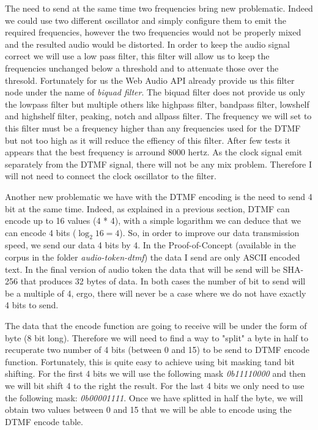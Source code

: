 \documentclass[twocolumn,14pt]{extarticle}
\begin{document}
The need to send at the same time two frequencies bring new problematic. Indeed we could use two different oscillator and simply configure them to emit the required frequencies, however the two frequencies would not be properly mixed and the resulted audio would be distorted. In order to keep the audio signal correct we will use a low pass filter, this filter will allow us to keep the frequencies unchanged below a threshold and to attenuate those over the thresold. Fortunately for us the Web Audio API already provide us this filter node under the name of \textit{biquad filter}. The biquad filter does not provide us only the lowpass filter but multiple others like highpass filter, bandpass filter, lowshelf and highshelf filter, peaking, notch and allpass filter. The frequency we will set to this filter must be a frequency higher than any frequencies used for the DTMF but not too high as it will reduce the effiency of this filter. After few tests it appears that the best frequency is arround 8000 hertz. As the clock signal emit separately from the DTMF signal, there will not be any mix problem. Therefore I will not need to connect the clock oscillator to the filter.

Another new problematic we have with the DTMF encoding is the need to send 4 bit at the same time. Indeed, as explained in a previous section, DTMF can encode up to 16 values (4 * 4), with a simple logarithm we can deduce that we can encode 4 bits ($\log_2 16 = 4$). So, in order to improve our data transmission speed, we send our data 4 bits by 4. In the Proof-of-Concept (available in the corpus in the folder \textit{audio-token-dtmf}) the data I send are only ASCII encoded text. In the final version of audio token the data that will be send will be SHA-256 that produces 32 bytes of data. In both cases the number of bit to send will be a multiple of 4, ergo, there will never be a case where we do not have exactly 4 bits to send.

The data that the encode function are going to receive will be under the form of byte (8 bit long). Therefore we will need to find a way to "split" a byte in half to recuperate two number of 4 bits (between 0 and 15) to be send to DTMF encode function. Fortunately, this is quite easy to achieve using bit masking tand bit shifting. For the first 4 bits we will use the following mask \textit{0b11110000} and then we will bit shift 4 to the right the result. For the last 4 bits we only need to use the following mask: \textit{0b00001111}. Once we have splitted in half the byte, we will obtain two values between 0 and 15 that we will be able to encode using the DTMF encode table.
\end{document}
